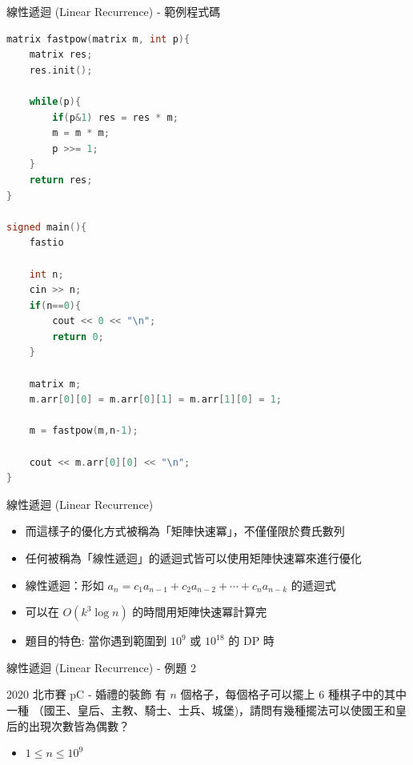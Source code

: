\documentclass[aspectratio=169]{beamer}
\begin{document}
    \begin{frame}[fragile]{線性遞迴 (Linear Recurrence) - 範例程式碼}
        \begin{lstlisting}[language=C++, basicstyle=\ttfamily \tiny]
matrix fastpow(matrix m, int p){
    matrix res;
    res.init();
 
    while(p){
        if(p&1) res = res * m;
        m = m * m;
        p >>= 1;
    }
    return res;
}
 
signed main(){
    fastio
 
    int n;
    cin >> n;
    if(n==0){
        cout << 0 << "\n";
        return 0;
    }
 
    matrix m;
    m.arr[0][0] = m.arr[0][1] = m.arr[1][0] = 1;
 
    m = fastpow(m,n-1);
 
    cout << m.arr[0][0] << "\n";
}
        \end{lstlisting}
    \end{frame}
    
    \begin{frame}[fragile]{線性遞迴 (Linear Recurrence)}
        \begin{itemize}
            \item 而這樣子的優化方式被稱為「矩陣快速冪」，不僅僅限於費氏數列
            \item 任何被稱為「線性遞迴」的遞迴式皆可以使用矩陣快速冪來進行優化
            \item 線性遞迴：形如 $a_n = c_1a_{n-1} + c_2a_{n-2} + \cdots + c_na_{n-k}$ 的遞迴式
            \item 可以在 $O(k^3 \log n)$ 的時間用矩陣快速冪計算完
            \item 題目的特色: 當你遇到範圍到 $10^9$ 或 $10^{18}$ 的 DP 時
        \end{itemize}
    \end{frame}
    
    \begin{frame}[fragile]{線性遞迴 (Linear Recurrence) - 例題 2}
        \begin{block}{2020 北市賽 pC - 婚禮的裝飾}
            有 $n$ 個格子，每個格子可以擺上 $6$ 種棋子中的其中一種 （國王、皇后、主教、騎士、士兵、城堡)，請問有幾種擺法可以使國王和皇后的出現次數皆為偶數？
            \begin{itemize}
                \item $1 \le n \le 10^9$
            \end{itemize}
        \end{block}
    \end{frame}
    
\end{document}
